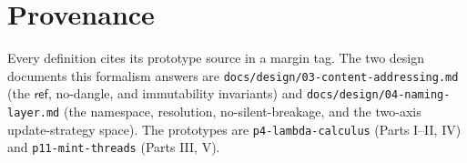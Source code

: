 \documentclass[11pt]{article}
\theoremstyle{definition}
\theoremstyle{plain}
\theoremstyle{remark}
\begin{document}
\section*{Provenance}
Every definition cites its prototype source in a margin tag. The two design documents this
formalism answers are \texttt{docs/design/03-content-addressing.md} (the $\mathsf{ref}$, no-dangle,
and immutability invariants) and \texttt{docs/design/04-naming-layer.md} (the namespace,
resolution, no-silent-breakage, and the two-axis update-strategy space). The prototypes are
\texttt{p4-lambda-calculus} (Parts I--II, IV) and \texttt{p11-mint-threads} (Parts III, V).



\end{document}
